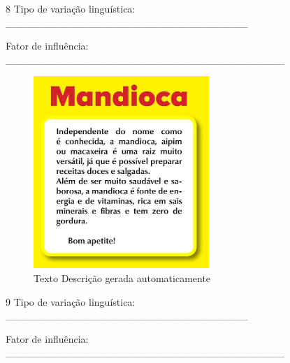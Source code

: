 \num{8} Tipo de variação linguística:
\_\_\_\_\_\_\_\_\_\_\_\_\_\_\_\_\_\_\_\_\_\_\_\_\_\_\_\_\_\_\_\_\_ 

Fator de influência:
\_\_\_\_\_\_\_\_\_\_\_\_\_\_\_\_\_\_\_\_\_\_\_\_\_\_\_\_\_\_\_\_\_\_\_\_\_\_ 

\begin{figure}
\centering
\includegraphics[width=2.61458in,height=2.86458in]{./imgSAEB_8_POR/media/image26.png}
\caption{Texto Descrição gerada automaticamente}
\end{figure}


\num{9} Tipo de variação linguística:
\_\_\_\_\_\_\_\_\_\_\_\_\_\_\_\_\_\_\_\_\_\_\_\_\_\_\_\_\_\_\_\_\_ 

Fator de influência:
\_\_\_\_\_\_\_\_\_\_\_\_\_\_\_\_\_\_\_\_\_\_\_\_\_\_\_\_\_\_\_\_\_\_\_\_\_\_ 







